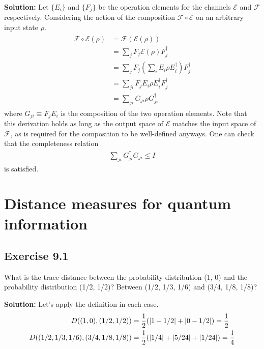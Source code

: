 \documentclass{book}
\newcommand{\mc}[1]{\mathcal{#1}}
\begin{document}
    \textbf{Solution:} Let $\{E_i\}$ and $\{F_j\}$ be the operation elements for the channels $\mc{E}$ and $\mc{F}$ respectively. Considering the action of the composition $\mc{F} \circ \mc{E}$ on an arbitrary input state $\rho$.
    \begin{align}
    \begin{aligned}
        \mc{F}\circ\mc{E} (\rho) &= \mc{F}(\mc{E}(\rho)) \\
        &= \sum_j F_j \mc{E}(\rho) F_j^\dagger \\
        &= \sum_j F_j \left(\sum_i E_i \rho E_i^\dagger \right) F_j^\dagger \\
        &= \sum_{ji} F_j E_i \rho E_i^\dagger F_j^\dagger \\
        &= \sum_{ji} G_{ji} \rho G_{ji}^\dagger 
    \end{aligned}
    \end{align}
    where $G_{ji} \equiv F_j E_i$ is the composition of the two operation elements. Note that this derivation holds as long as the output space of $\mc{E}$ matches the input space of $\mc{F}$, as is required for the composition to be well-defined anyways. One can check that the completeness relation
    \begin{align}
        \sum_{ji}G_{ji}^\dagger G_{ji} \leq I 
    \end{align}
    is satisfied.

\chapter{Distance measures for quantum information}

\section*{Exercise 9.1}
    What is the trace distance between the probability distribution (1, 0) and the probability distribution (1/2, 1/2)? Between (1/2, 1/3, 1/6) and (3/4, 1/8, 1/8)?
    
    \textbf{Solution:} Let's apply the definition in each case.
    \begin{align}
    \begin{aligned}
        D((1,0), (1/2,1/2)) &= \frac{1}{2} (\abs{1-1/2}+\abs{0-1/2}) = \frac{1}{2}\\
        D((1/2,1/3,1/6), (3/4,1/8,1/8)) &= \frac{1}{2} (\abs{1/4} + \abs{5/24}+\abs{1/24}) = \frac{1}{4}
    \end{aligned}
    \end{align}
    
\end{document}
